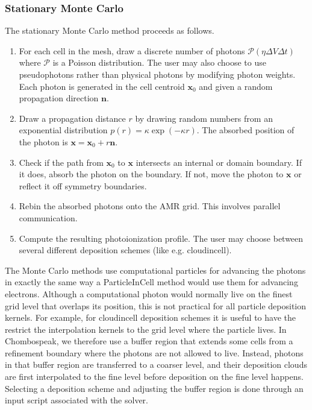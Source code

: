 \documentclass[letterpaper,10pt,english]{sphinxmanual}
\begin{document}
\subsubsection{Stationary Monte Carlo}
\label{\detokenize{RTE:stationary-monte-carlo}}
The stationary Monte Carlo method proceeds as follows.
\begin{enumerate}
%
\item {} 
For each cell in the mesh, draw a discrete number of photons \(\mathcal{P}\left(\eta \Delta V\Delta t\right)\) where \(\mathcal{P}\) is a Poisson distribution. The user may also choose to use pseudophotons rather than physical photons by modifying photon weights. Each photon is generated in the cell centroid \(\mathbf{x}_0\) and given a random propagation direction \(\mathbf{n}\).

\item {} 
Draw a propagation distance \(r\) by drawing random numbers from an exponential distribution \(p(r) = \kappa \exp\left(-\kappa r\right)\). The absorbed position of the photon is \(\mathbf{x} = \mathbf{x}_0 + r\mathbf{n}\).

\item {} 
Check if the path from \(\mathbf{x}_0\) to \(\mathbf{x}\) intersects an internal or domain boundary. If it does, absorb the photon on the boundary. If not, move the photon to \(\mathbf{x}\) or reflect it off symmetry boundaries.

\item {} 
Rebin the absorbed photons onto the AMR grid. This involves parallel communication.

\item {} 
Compute the resulting photoionization profile. The user may choose between several different deposition schemes (like e.g. cloud\sphinxhyphen{}in\sphinxhyphen{}cell).

\end{enumerate}

The Monte Carlo methods use computational particles for advancing the photons in exactly the same way a Particle\sphinxhyphen{}In\sphinxhyphen{}Cell method would use them for advancing electrons. Although a computational photon would normally live on the finest grid level that overlaps its position, this is not practical for all particle deposition kernels. For example, for cloud\sphinxhyphen{}in\sphinxhyphen{}cell deposition schemes it is useful to have the restrict the interpolation kernels to the grid level where the particle lives. In Chombo\sphinxhyphen{}speak, we therefore use a buffer region that extends some cells from a refinement boundary where the photons are not allowed to live. Instead, photons in that buffer region are transferred to a coarser level, and their deposition clouds are first interpolated to the fine level before deposition on the fine level happens. Selecting a deposition scheme and adjusting the buffer region is done through an input script associated with the solver.
\end{document}
